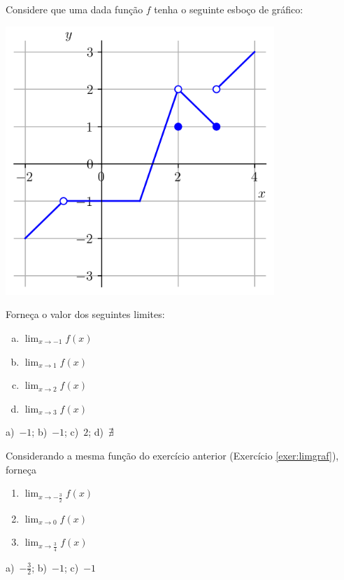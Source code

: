 \begin{exer}\label{exer:limgraf}
  Considere que uma dada função $f$ tenha o seguinte esboço de gráfico:

  \begin{center}
    \includegraphics[width=4in]{./cap_lim/dados/fig_exer_limgraf/fig.png}
  \end{center}

  Forneça o valor dos seguintes limites:
  \begin{enumerate}[a)]
  \item $\displaystyle \lim_{x\to -1} f(x)$
  \item $\displaystyle \lim_{x\to 1} f(x)$
  \item $\displaystyle \lim_{x\to 2} f(x)$
  \item $\displaystyle \lim_{x\to 3} f(x)$
  \end{enumerate}
\end{exer}
\begin{resp}
  a)~$-1$; b)~$-1$; c)~$2$; d)~$\nexists$
\end{resp}

\begin{exer}
  Considerando a mesma função do exercício anterior (Exercício \ref{exer:limgraf}), forneça
  \begin{enumerate}
  \item $\displaystyle \lim_{x\to -\frac{3}{2}} f(x)$
  \item $\displaystyle \lim_{x\to 0} f(x)$
  \item $\displaystyle \lim_{x\to \frac{3}{4}} f(x)$
  \end{enumerate}
\end{exer}
\begin{resp}
  a)~$-\frac{3}{2}$; b)~$-1$; c)~$-1$
\end{resp}

